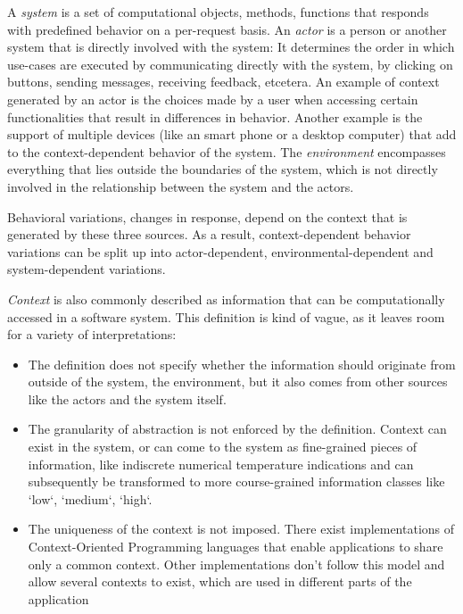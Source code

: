 \documentclass{acm_proc_article-sp}
\begin{document}
A \textit{system} is a set of computational objects, methods, functions that responds with predefined behavior on a per-request basis. An \textit{actor} is a person or another system that is directly involved with the system: It determines the order in which use-cases are executed by communicating directly with the system, by clicking on buttons, sending messages, receiving feedback, etcetera. An example of context generated by an actor is the choices made by a user when accessing certain functionalities that result in differences in behavior. Another example is the support of multiple devices (like an smart phone or a desktop computer) that add to the context-dependent behavior of the system. The \textit{environment} encompasses everything that lies outside the boundaries of the system, which is not directly involved in the relationship between the system and the actors.

Behavioral variations, changes in response, depend on the context that is generated by these three sources. As a result, context-dependent behavior variations can be split up into actor-dependent, environmental-dependent and  system-\linebreak dependent variations.

\textit{Context} is also commonly described as information that can be computationally accessed in a software system. This definition is kind of vague, as it leaves room for a variety of interpretations:

\begin{itemize}
\item The definition does not specify whether the information should originate from outside of the system, the environment, but it also comes from other sources like the actors and the system itself.
\item The granularity of abstraction is not enforced by the definition. Context can exist in the system, or can come to the system as fine-grained pieces of information, like indiscrete numerical temperature indications and can subsequently be transformed to more course-grained information classes like `low`, `medium`, `high`. 
\item The uniqueness of the context is not imposed. There exist implementations of Context-Oriented Programming languages that enable applications to share only a common context. Other implementations don't follow this model and allow several contexts to exist, which are used in different parts of the application \cite{Appeltauer:2009:CCP:1562112.1562118}
\end{itemize}
\end{document}
